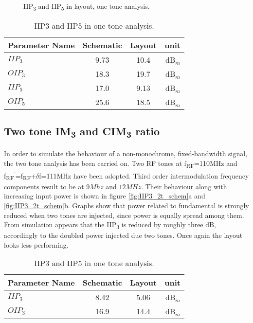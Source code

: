 \begin{figure}[H] 
	\centering
	 \\
	\caption{IIP\textsubscript{3} and IIP\textsubscript{5} in layout, one tone analysis.}
	\label{fig:IIP3_1t_layout}
\end{figure}

\begin{table} [H]
	\label{tab:IIP3_1tone}
	\caption{IIP3 and IIP5 in one tone analysis.}
	\centering	
	\begin{tabular}{lccr} 
		\toprule 
		Parameter Name			& Schematic 	& Layout & unit \\ 
		\midrule
		\(IIP_{3}\)  & 9.73 & 10.4 & dB\(_{m}\) \\
		\(OIP_{3}\)  & 18.3 &19.7 & dB\(_{m}\) \\
		\(IIP_{5}\)  & 17.0 &9.13 & dB\(_{m}\) \\
		\(OIP_{5}\)  & 25.6 &18.5 & dB\(_{m}\) \\
		\bottomrule 
	\end{tabular}	
\end{table}
\subsection{Two tone IM\textsubscript{3} and CIM\textsubscript{3} ratio}
In order to simulate the behaviour of a non-monochrome, fixed-bandwidth signal, the two tone analysis has been carried on. Two RF tones at f\textsubscript{RF}=110MHz and f\textsubscript{RF}\textsuperscript{'}=f\textsubscript{RF}+\(\delta\)f=111MHz have been adopted. Third order intermodulation frequency components result to be at \(9Mhz\) and \(12MHz\). Their behaviour along with increasing input power is shown in figure \ref{fig:IIP3_2t_schem}a and \ref{fig:IIP3_2t_schem}b. 
Graphs show that power related to fundamental is strongly reduced when two tones are injected, since power is equally spread among them. From simulation appears that the IIP\textsubscript{3} is reduced by roughly three dB, accordingly to the doubled power injected due two tones. Once again the layout looks less performing.

\begin{table} [H]
	\label{tab:IIP3_2tone}
	\caption{IIP3 and IIP5 in one tone analysis.}
	\centering	
	\begin{tabular}{lccr} 
		\toprule 
		Parameter Name			& Schematic 	& Layout & unit \\ 
		\midrule
		\(IIP_{3}\)  & 8.42 & 5.06 & dB\(_{m}\) \\
		\(OIP_{3}\)  & 16.9 &14.4 & dB\(_{m}\) \\
		\bottomrule 
	\end{tabular}	
\end{table}


